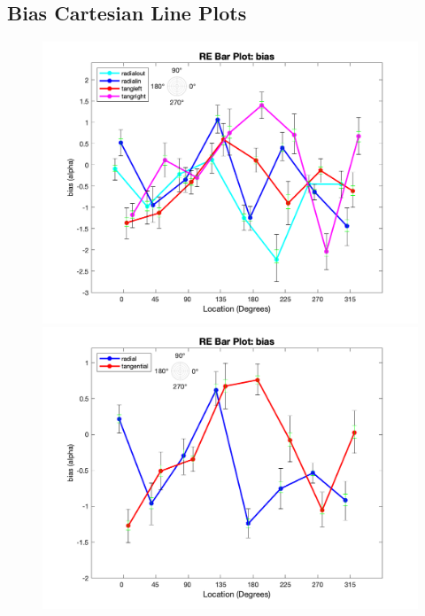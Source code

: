 \documentclass[11pt]{article} %
\begin{document}
\newpage
\subsection{Bias Cartesian Line Plots}
\begin{figure}[H]
\centering %
\includegraphics[scale=.3]{Images/RE_LP_bias_Alldata_4conds.png}
\includegraphics[scale=.3]{Images/RE_LP_bias_Alldata_2conds.png}
\end{figure}
\end{document}
